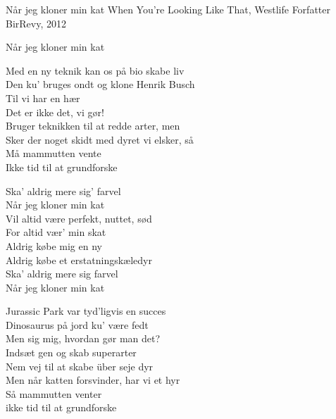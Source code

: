 \begin{song}{Når jeg kloner min kat}
  {} %
  {When You're Looking Like That, Westlife} %
  {Forfatter} %
  {BirRevy, 2012} %
  {\NotCCLIed} %

  \begin{SBSection*}
    Når jeg kloner min kat
  \end{SBSection*}

  \begin{SBVerse}
    Med en ny teknik kan os på bio skabe liv\\
    Den ku' bruges ondt og klone Henrik Busch\\
    Til vi har en hær\\
    Det er ikke det, vi gør!\\
    Bruger teknikken til at redde arter, men\\
    Sker der noget skidt med dyret vi elsker, så\\
    Må mammutten vente\\
    Ikke tid til at grundforske
  \end{SBVerse}

  \begin{SBChorus}
    Ska' aldrig mere sig' farvel\\
    Når jeg kloner min kat\\
    Vil altid være perfekt, nuttet, sød\\
    For altid vær' min skat\\
    Aldrig købe mig en ny\\
    Aldrig købe et erstatningskæledyr\\
    Ska' aldrig mere sig farvel\\
    Når jeg kloner min kat
  \end{SBChorus}

  \begin{SBVerse}
    Jurassic Park var tyd'ligvis en succes\\
    Dinosaurus på jord ku' være fedt\\
    Men sig mig, hvordan gør man det?\\
    Indsæt gen og skab superarter\\
    Nem vej til at skabe über seje dyr\\
    Men når katten forsvinder, har vi et hyr\\
    Så mammutten venter\\
    ikke tid til at grundforske
  \end{SBVerse}


\end{song}
